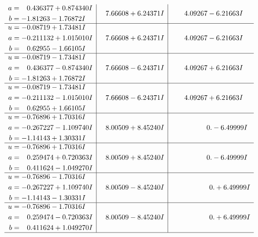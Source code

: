 \documentclass[1p]{elsarticle_modified}
\theoremstyle{definition}
\begin{document}
$$\begin{array}{c|c|c}
\begin{aligned}
a &= \phantom{-}0.436377 + 0.874340 I \\
b &= -1.81263 - 1.76872 I\end{aligned}
 & \phantom{-}7.66608 + 6.24371 I & \phantom{-}4.09267 - 6.21663 I \\ \hline\begin{aligned}
u &= -0.08719 + 1.73481 I \\
a &= -0.211132 + 1.015010 I \\
b &= \phantom{-}0.62955 - 1.66105 I\end{aligned}
 & \phantom{-}7.66608 + 6.24371 I & \phantom{-}4.09267 - 6.21663 I \\ \hline\begin{aligned}
u &= -0.08719 - 1.73481 I \\
a &= \phantom{-}0.436377 - 0.874340 I \\
b &= -1.81263 + 1.76872 I\end{aligned}
 & \phantom{-}7.66608 - 6.24371 I & \phantom{-}4.09267 + 6.21663 I \\ \hline\begin{aligned}
u &= -0.08719 - 1.73481 I \\
a &= -0.211132 - 1.015010 I \\
b &= \phantom{-}0.62955 + 1.66105 I\end{aligned}
 & \phantom{-}7.66608 - 6.24371 I & \phantom{-}4.09267 + 6.21663 I \\ \hline\begin{aligned}
u &= -0.76896 + 1.70316 I \\
a &= -0.267227 - 1.109740 I \\
b &= -1.14143 + 1.30331 I\end{aligned}
 & \phantom{-}8.00509 + 8.45240 I & \phantom{-0.000000 } 0. - 6.49999 I \\ \hline\begin{aligned}
u &= -0.76896 + 1.70316 I \\
a &= \phantom{-}0.259474 + 0.720363 I \\
b &= \phantom{-}0.411624 - 1.049270 I\end{aligned}
 & \phantom{-}8.00509 + 8.45240 I & \phantom{-0.000000 } 0. - 6.49999 I \\ \hline\begin{aligned}
u &= -0.76896 - 1.70316 I \\
a &= -0.267227 + 1.109740 I \\
b &= -1.14143 - 1.30331 I\end{aligned}
 & \phantom{-}8.00509 - 8.45240 I & \phantom{-0.000000 -}0. + 6.49999 I \\ \hline\begin{aligned}
u &= -0.76896 - 1.70316 I \\
a &= \phantom{-}0.259474 - 0.720363 I \\
b &= \phantom{-}0.411624 + 1.049270 I\end{aligned}
 & \phantom{-}8.00509 - 8.45240 I & \phantom{-0.000000 -}0. + 6.49999 I\\
 \hline 
 \end{array}$$\newpage\newpage\renewcommand{\arraystretch}{1}
\end{document}
